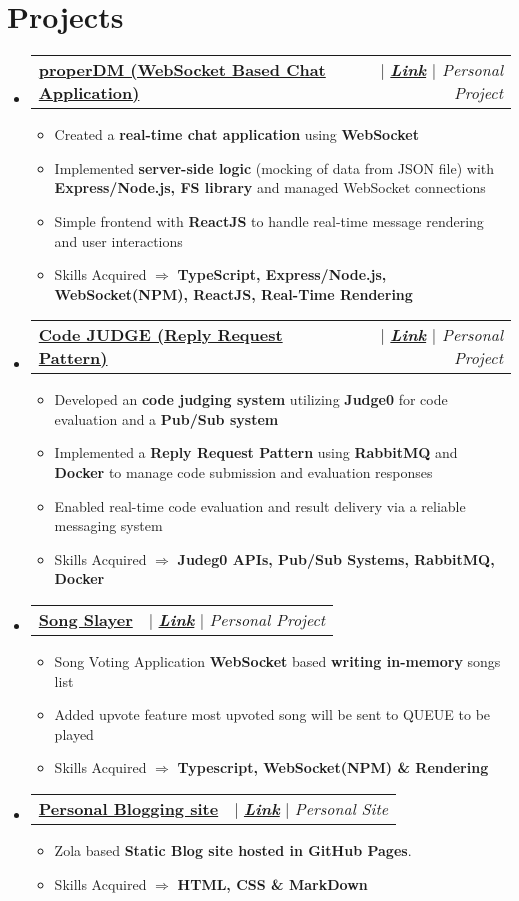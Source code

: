 \documentclass[letterpaper,11pt]{article}
\makeatletter
\newcommand{\resumeItem}[1]{
  \item\small{
    {#1 \vspace{-2pt}}
  }
}
\newcommand{\resumeProjectHeading}[2]{
    \item
    \begin{tabular*}{0.97\textwidth}{l@{\extracolsep{\fill}}r}
      \small#1 & #2 \\
    \end{tabular*}\vspace{-7pt}
}
\newcommand{\resumeSubHeadingListStart}{\begin{itemize}[leftmargin=0.15in, label={}]}
\newcommand{\resumeSubHeadingListEnd}{\end{itemize}}
\newcommand{\resumeItemListStart}{\begin{itemize}}
\newcommand{\resumeItemListEnd}{\end{itemize}\vspace{-5pt}}
\makeatother
\begin{document}
\section{Projects}
    \resumeSubHeadingListStart
      \resumeProjectHeading
          {\href{https://github.com/adityadeshlahre/properDM}{\textbf{properDM (WebSocket Based Chat Application)}}}
          {{ $|$ \emph{\href{https://github.com/adityadeshlahre/properDM}{\textbf{Link}} $|$ Personal Project}}}
          \resumeItemListStart
                \resumeItem{Created a \textbf{real-time chat application} using \textbf{WebSocket}}
                \resumeItem{Implemented \textbf{server-side logic} (mocking of data from JSON file) with \textbf{Express/Node.js, FS library} and managed WebSocket connections}
                \resumeItem{Simple frontend with \textbf{ReactJS} to handle real-time message rendering and user interactions}
                \resumeItem{Skills Acquired $\Longrightarrow$ \textbf{TypeScript, Express/Node.js, WebSocket(NPM), ReactJS, Real-Time Rendering}}
            \resumeItemListEnd
      \resumeProjectHeading
          {\href{https://github.com/adityadeshlahre/rabbitMQ-RPC} {\textbf{Code JUDGE (Reply Request Pattern)}}}
          {{ $|$ \emph{\href{https://github.com/adityadeshlahre/rabbitMQ-RPC}{\textbf{Link}} $|$ {Personal Project}}}}
          \resumeItemListStart
             \resumeItem{Developed an \textbf{ code judging system} utilizing \textbf{Judge0} for code evaluation and a \textbf{Pub/Sub system}}
             \resumeItem{Implemented a \textbf{Reply Request Pattern} using \textbf{RabbitMQ} and \textbf{Docker} to manage code submission and evaluation responses}
             \resumeItem{Enabled real-time code evaluation and result delivery via a reliable messaging system}
             \resumeItem{Skills Acquired $\Longrightarrow$ \textbf{Judeg0 APIs, Pub/Sub Systems, RabbitMQ, Docker}}
           \resumeItemListEnd
      \resumeProjectHeading
          {\href{https://github.com/adityadeshlahre/songSlayer}{\textbf{Song Slayer}}}
          {{ $|$ \emph{\href{https://github.com/adityadeshlahre/songSlayer}{\textbf{Link}}}{ $|$ \emph{Personal Project}}}}
          \resumeItemListStart
            \resumeItem{Song Voting Application \textbf{WebSocket} based \textbf{writing in-memory} songs list}
            \resumeItem{Added upvote feature most upvoted song will be sent to QUEUE to be played}
            \resumeItem{Skills Acquired $\Longrightarrow$ \textbf{Typescript, WebSocket(NPM) \& Rendering}}
          \resumeItemListEnd
      \resumeProjectHeading
          {\href{https://adityadeshlahre.github.io/}{\textbf{Personal Blogging site}}}
          {{{ $|$ \emph{\href{https://github.com/adityadeshlahre/songSlayer}{\textbf{Link}}} $|$ \emph{Personal Site}}}}
          \resumeItemListStart
            \resumeItem{Zola based \textbf{Static Blog site hosted in GitHub Pages}.}
            \resumeItem{Skills Acquired $\Longrightarrow$ \textbf{HTML, CSS \& MarkDown}}
          \resumeItemListEnd
    \resumeSubHeadingListEnd
\end{document}
